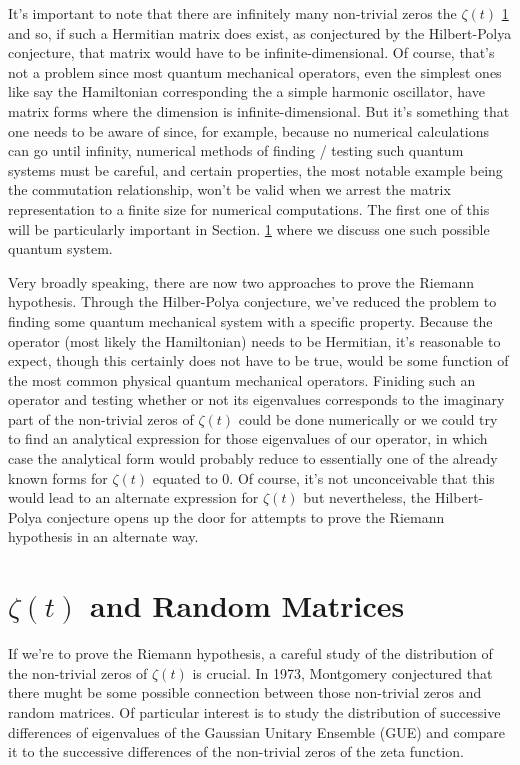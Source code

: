 \documentclass{amsproc}
\theoremstyle{definition}
\theoremstyle{remark}
\numberwithin{equation}{section}
\begin{document}
It's important to note that there are infinitely many non-trivial zeros the $\zeta(t)$ \ref{} and so, if such a Hermitian matrix does exist, as conjectured by the Hilbert-Polya conjecture, that matrix would have to be infinite-dimensional. Of course, that's not a problem since most quantum mechanical operators, even the simplest ones like say the Hamiltonian corresponding the a simple harmonic oscillator, have matrix forms where the dimension is infinite-dimensional. But it's something that one needs to be aware of since, for example, because no numerical calculations can go until infinity, numerical methods of finding / testing such quantum systems must be careful, and certain properties, the most notable example being the commutation relationship, won't be valid when we arrest the matrix representation to a finite size for numerical computations. The first one of this will be particularly important in Section. \ref{} where we discuss one such possible quantum system. 

Very broadly speaking, there are now two approaches to prove the Riemann hypothesis. Through the Hilber-Polya conjecture, we've reduced the problem to finding some quantum mechanical system with a specific property. Because the operator (most likely the Hamiltonian) needs to be Hermitian, it's reasonable to expect, though this certainly does not have to be true, would be some function of the most common physical quantum mechanical operators. Finiding such an operator and testing whether or not its eigenvalues corresponds to the imaginary part of the non-trivial zeros of $\zeta(t)$ could be done numerically or we could try to find an analytical expression for those eigenvalues of our operator, in which case the analytical form would probably reduce to essentially one of the already known forms for $\zeta(t)$ equated to 0. Of course, it's not unconceivable that this would lead to an alternate expression for $\zeta(t)$ but nevertheless, the Hilbert-Polya conjecture opens up the door for attempts to prove the Riemann hypothesis in an alternate way. 


\section{$\zeta(t)$ and Random Matrices}
If we're to prove the Riemann hypothesis, a careful study of the distribution of the non-trivial zeros of $\zeta(t)$ is crucial. In 1973, Montgomery conjectured that there mught be some possible connection between those non-trivial zeros and random matrices. Of particular interest is to study the distribution of successive differences of eigenvalues of the Gaussian Unitary Ensemble (GUE) and compare it to the successive differences of the non-trivial zeros of the zeta function. 
\end{document}
